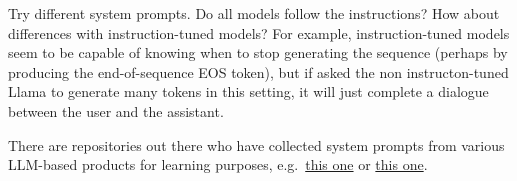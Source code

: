 \documentclass[11pt,a4paper]{article}
\begin{document}
\begin{enumerate}[label=(\alph*)]
          Try different system prompts. Do all models follow the instructions?
          How about differences with instruction-tuned models?
          For example, instruction-tuned models seem to be capable of knowing 
          when to stop generating the sequence (perhaps by producing the 
          end-of-sequence EOS token), but if asked the non instructon-tuned 
          Llama to generate many tokens in this setting, it will just complete 
          a dialogue between the user and the assistant.

          There are repositories out there who have collected system prompts 
          from various LLM-based products for learning purposes, e.g.\ 
          \href{https://github.com/0xeb/TheBigPromptLibrary}{this one} or
          \href{https://github.com/guy915/System-Prompts}{this one}.
\end{enumerate}
\end{document}
